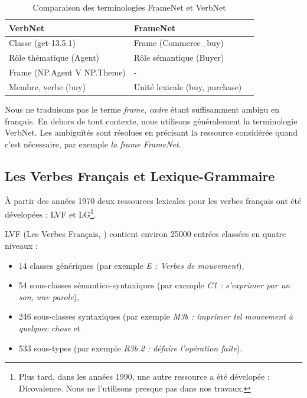 \begin{table}[ht]
    \centering
    \begin{tabular}{lll}
        \toprule
        VerbNet & FrameNet \\
        \midrule
        Classe (get-13.5.1) & Frame (Commerce\_buy) \\
        Rôle thématique (Agent) & Rôle sémantique (Buyer) \\
        Frame (NP.Agent V NP.Theme) & - \\
        Membre, verbe (buy) & Unité lexicale (buy, purchase) \\
        \bottomrule
    \end{tabular}
    \caption{\label{fnvsvn}Comparaison des terminologies FrameNet et VerbNet}
\end{table}

Nous ne traduisons pas le terme \textit{frame}, \textit{cadre} étant
suffisamment ambigu en français. En dehors de tout contexte, nous utilisons
généralement la terminologie VerbNet. Les ambiguïtés sont résolues en précisant
la ressource considérée quand c'est nécessaire, par exemple \textit{la frame
FrameNet}.

\subsection{Les Verbes Français et Lexique-Grammaire}
\label{sec:lvflg}

À partir des années 1970 deux ressources lexicales pour les verbes français ont
été dévelopées : LVF et LG\footnote{Plus tard, dans les années 1990, une autre
    ressource a été dévelopée : Dicovalence. Nous ne l'utilisons presque pas
dans nos travaux.}.

LVF (Les Verbes Français, \cite{dubois1997verbes}) contient environ 25000
entrées classées en quatre niveaux :

\begin{itemize}

    \item 14 classes génériques (par exemple \textit{E : Verbes de mouvement}),

    \item 54 sous-classes sémantico-syntaxiques (par exemple \textit{C1 :
        s'exprimer par un son, une parole}),

    \item 246 sous-classes syntaxiques (par exemple \textit{M3b : imprimer tel
        mouvement à quelquec chose} et

    \item 533 sous-types (par exemple \textit{R3b.2 : défaire l'opération
        faite}).

\end{itemize}

